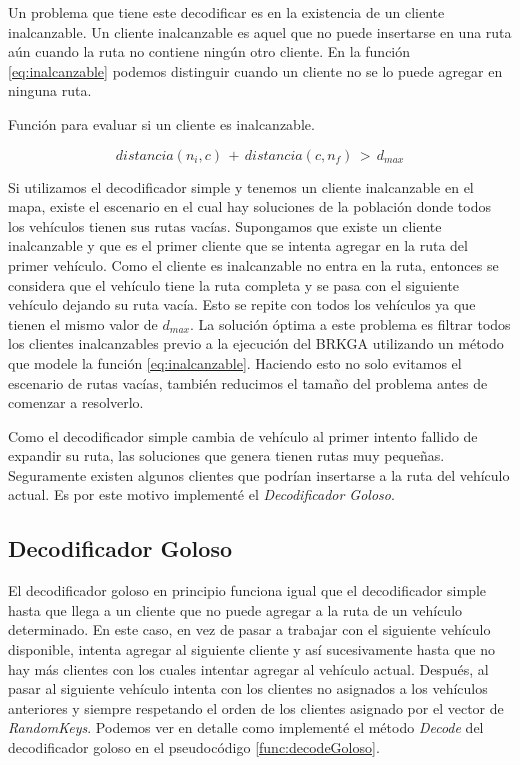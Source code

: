 \bigskip

Un problema que tiene este decodificar es en la existencia de un cliente inalcanzable. Un cliente inalcanzable es aquel que no puede insertarse en una ruta aún cuando la ruta no contiene ningún otro cliente. En la función \ref{eq:inalcanzable} podemos distinguir cuando un cliente no se lo puede agregar en ninguna ruta.

\bigskip

\begin{mycapequ}[!ht]
	\caption{Función para evaluar si un cliente es inalcanzable.}
	\begin{equation} \label{eq:inalcanzable}
	distancia(n_i, c)\, +\, distancia(c, n_f)\, >\, d_{max}
	\end{equation}
\end{mycapequ}

\bigskip

Si utilizamos el decodificador simple y tenemos un cliente inalcanzable en el mapa, existe el escenario en el cual hay soluciones de la población donde todos los vehículos tienen sus rutas vacías. Supongamos que existe un cliente inalcanzable y que es el primer cliente que se intenta agregar en la ruta del primer vehículo. Como el cliente es inalcanzable no entra en la ruta, entonces se considera que el vehículo tiene la ruta completa y se pasa con el siguiente vehículo dejando su ruta vacía. Esto se repite con todos los vehículos ya que tienen el mismo valor de $d_{max}$. La solución óptima a este problema es filtrar todos los clientes inalcanzables previo a la ejecución del BRKGA utilizando un método que modele la función \ref{eq:inalcanzable}. Haciendo esto no solo evitamos el escenario de rutas vacías, también reducimos el tamaño del problema antes de comenzar a resolverlo. 

\bigskip

Como el decodificador simple cambia de vehículo al primer intento fallido de expandir su ruta, las soluciones que genera tienen rutas muy pequeñas. Seguramente existen algunos clientes que podrían insertarse a la ruta del vehículo actual. Es por este motivo implementé el \textit{Decodificador Goloso}.


\subsection{Decodificador Goloso}

El decodificador goloso en principio funciona igual que el decodificador simple hasta que llega a un cliente que no puede agregar a la ruta de un vehículo determinado. En este caso, en vez de pasar a trabajar con el siguiente vehículo disponible, intenta agregar al siguiente cliente y así sucesivamente hasta que no hay más clientes con los cuales intentar agregar al vehículo actual. Después, al pasar al siguiente vehículo intenta con los clientes no asignados a los vehículos anteriores y siempre respetando el orden de los clientes asignado por el vector de \textit{RandomKeys}. Podemos ver en detalle como implementé el método \textit{Decode} del decodificador goloso en el pseudocódigo \ref{func:decodeGoloso}.  

